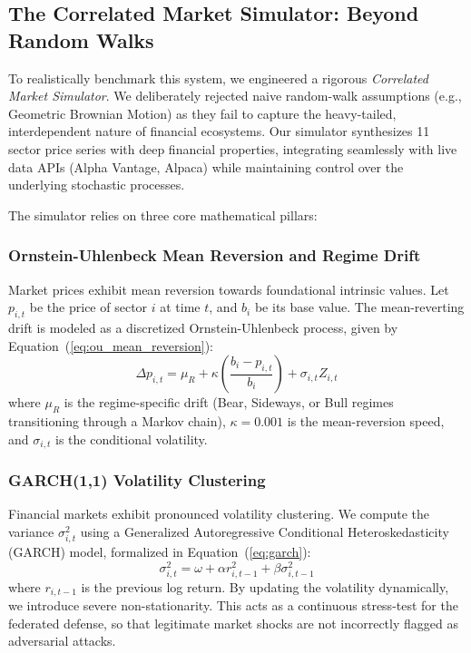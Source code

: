 \documentclass[journal]{IEEEtran}
\begin{document}
\subsection{The Correlated Market Simulator: Beyond Random Walks}

To realistically benchmark this system, we engineered a rigorous \emph{Correlated Market Simulator}. We deliberately rejected naive random-walk assumptions (e.g., Geometric Brownian Motion) as they fail to capture the heavy-tailed, interdependent nature of financial ecosystems. Our simulator synthesizes 11 sector price series with deep financial properties, integrating seamlessly with live data APIs (Alpha Vantage, Alpaca) while maintaining control over the underlying stochastic processes.

The simulator relies on three core mathematical pillars:

\subsubsection{Ornstein-Uhlenbeck Mean Reversion and Regime Drift}
Market prices exhibit mean reversion towards foundational intrinsic values. Let $p_{i,t}$ be the price of sector $i$ at time $t$, and $b_i$ be its base value. The mean-reverting drift is modeled as a discretized Ornstein-Uhlenbeck process, given by Equation~(\ref{eq:ou_mean_reversion}):
\begin{equation}
\Delta p_{i,t} = \mu_R + \kappa \left( \frac{b_i - p_{i,t}}{b_i} \right) + \sigma_{i,t} Z_{i,t}
\label{eq:ou_mean_reversion}
\end{equation}
where $\mu_R$ is the regime-specific drift (Bear, Sideways, or Bull regimes transitioning through a Markov chain), $\kappa = 0.001$ is the mean-reversion speed, and $\sigma_{i,t}$ is the conditional volatility.

\subsubsection{GARCH(1,1) Volatility Clustering}
Financial markets exhibit pronounced volatility clustering. We compute the variance $\sigma_{i,t}^2$ using a Generalized Autoregressive Conditional Heteroskedasticity (GARCH) model, formalized in Equation~(\ref{eq:garch}):
\begin{equation}
\sigma_{i,t}^2 = \omega + \alpha r_{i,t-1}^2 + \beta \sigma_{i,t-1}^2
\label{eq:garch}
\end{equation}
where $r_{i,t-1}$ is the previous log return. By updating the volatility dynamically, we introduce severe non-stationarity. This acts as a continuous stress-test for the federated defense, so that legitimate market shocks are not incorrectly flagged as adversarial attacks.
\end{document}
